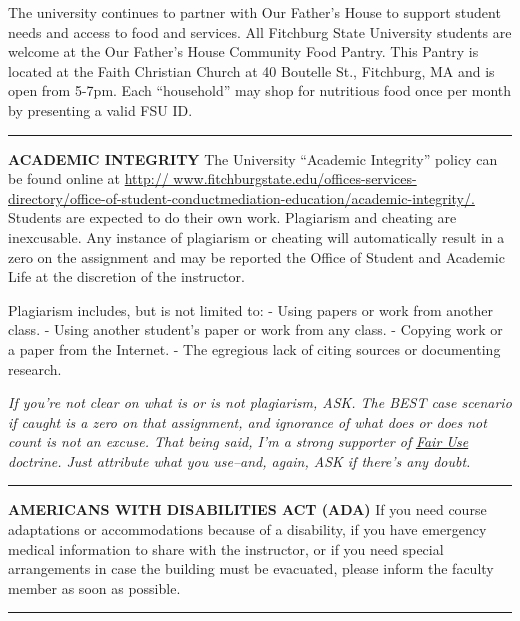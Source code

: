 \documentclass[]{tufte-handout}
\begin{document}
The university continues to partner with Our Father's House to support
student needs and access to food and services. All Fitchburg State
University students are welcome at the Our Father's House Community Food
Pantry. This Pantry is located at the Faith Christian Church at 40
Boutelle St., Fitchburg, MA and is open from 5-7pm. Each ``household''
may shop for nutritious food once per month by presenting a valid FSU
ID.

\begin{center}\rule{0.5\linewidth}{0.5pt}\end{center}

\textbf{ACADEMIC INTEGRITY} The University ``Academic Integrity'' policy
can be found online at
\href{http://www.fitchburgstate.edu/offices-services-directory/office-of-student-conduct-mediation-education/academic-integrity/}{http://
www.fitchburgstate.edu/offices-services-directory/office-of-student-conductmediation-education/academic-integrity/.}
Students are expected to do their own work. Plagiarism and cheating are
inexcusable. Any instance of plagiarism or cheating will automatically
result in a zero on the assignment and may be reported the Office of
Student and Academic Life at the discretion of the instructor.

Plagiarism includes, but is not limited to: - Using papers or work from
another class. - Using another student's paper or work from any class. -
Copying work or a paper from the Internet. - The egregious lack of
citing sources or documenting research.

\emph{If you're not clear on what is or is not plagiarism, ASK. The BEST
case scenario if caught is a zero on that assignment, and ignorance of
what does or does not count is not an excuse. That being said, I'm a
strong supporter of}
\emph{\href{https://en.wikipedia.org/wiki/Fair_Use}{Fair Use} doctrine.
Just attribute what you use--and, again, ASK if there's any doubt.}

\begin{center}\rule{0.5\linewidth}{0.5pt}\end{center}

\textbf{AMERICANS WITH DISABILITIES ACT (ADA)} If you need course
adaptations or accommodations because of a disability, if you have
emergency medical information to share with the instructor, or if you
need special arrangements in case the building must be evacuated, please
inform the faculty member as soon as possible.

\begin{center}\rule{0.5\linewidth}{0.5pt}\end{center}
\end{document}
